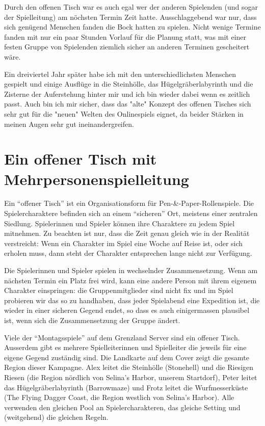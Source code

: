 \documentclass[11pt]{wbzine}
\begin{document}
\begin{multicols}{2}
Durch den offenen Tisch war es auch egal wer der anderen Spielenden (und
sogar der Spielleitung) am nöchsten Termin Zeit hatte. Ausschlaggebend
war nur, dass sich genügend Menschen fanden die Bock hatten zu
spielen. Nicht wenige Termine fanden mit nur ein paar Stunden Vorlauf
für die Planung statt, was mit einer festen Gruppe von Spielenden
ziemlich sicher an anderen Terminen gescheitert wäre.

Ein dreiviertel Jahr später habe ich mit den unterschiedlichsten
Menschen gespielt und einige Ausflüge in die Steinhölle, das
Hügelgräberlabyrinth und die Zisterne der Auferstehung hinter mir und
ich bin wieder dabei wenn es zeitlich passt. Auch bin ich mir sicher,
dass das "alte" Konzept des offenen Tisches sich sehr gut für die "neuen"
Welten des Onlinespiels eignet, da beider Stärken in meinen Augen sehr
gut ineinandergreifen.

\section{Ein offener Tisch mit Mehrpersonenspielleitung}

Ein “offener Tisch” ist ein Organisationsform für Pen-\&-Paper-Rollenspiele.
Die Spielercharaktere befinden sich an einem “sicheren” Ort, meistens einer
zentralen Siedlung. Spielerinnen und Spieler können ihre Charaktere zu jedem
Spiel mitnehmen. Zu beachten ist nur, dass die Zeit genau gleich wie in der
Realität verstreicht: Wenn ein Charakter im Spiel eine Woche auf Reise ist,
oder sich erholen muss, dann steht der Charakter entsprechen lange nicht zur
Verfügung.

Die Spielerinnen und Spieler spielen in wechselnder Zusammensetzung. Wenn am
nächsten Termin ein Platz frei wird, kann eine andere Person mit ihrem eigenem
Charakter einspringen: die Gruppenmitglieder sind nicht fix und im Spiel
probieren wir das so zu handhaben, dass jeder Spielabend eine Expedition ist,
die wieder in einer sicheren Gegend endet, so dass es auch einigermassen
plausibel ist, wenn sich die Zusammensetzung der Gruppe ändert.

Viele der ``Montagsspiele'' auf dem Grenzland Server sind ein offener Tisch.
Ausserdem gibt es mehrere Spielleiterinnen und Spielleiter die jeweils für
eine eigene Gegend zuständig sind. Die Landkarte auf dem Cover zeigt die
gesamte Region dieser Kampagne. Alex leitet die Steinhölle (Stonehell) und die
Riesigen Riesen (die Region nördlich von Selina's Harbor, unserem Startdorf),
Peter leitet das Hügelgräberlabyrinth (Barrowmaze) und Frotz leitet die
Wurfmesserküste (The Flying Dagger Coast, die Region westlich von Selina's
Harbor). Alle verwenden den gleichen Pool an Spielercharakteren, das gleiche
Setting und (weitgehend) die gleichen Regeln.


\end{multicols}
\end{document}
